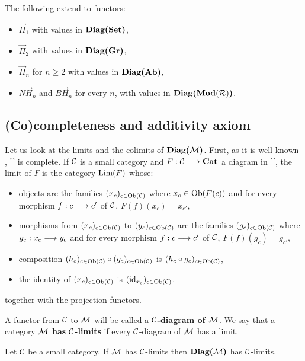 	\begin{coro}
	The following extend to functors:
	\begin{itemize}
		\item $\overrightarrow{\Pi}_1$ with values in $\textbf{Diag(}\textbf{Set}\textbf{)}$,
		\item $\overrightarrow{\Pi}_2$ with values in $\textbf{Diag(}\textbf{Gr}\textbf{)}$,
		\item $\overrightarrow{\Pi}_n$ for $n \geq 2$ with values in $\textbf{Diag(}\textbf{Ab}\textbf{)}$,
		\item $\overrightarrow{NH}_n$ and $\overrightarrow{BH}_n$ for every $n$, with values in $\textbf{Diag(}\textbf{Mod}(\mathcal{R})\textbf{)}$.
	\end{itemize}
	\end{coro}

	
	\subsection{(Co)completeness and additivity axiom}
	
	Let us look at the limits and the colimits of $\textbf{Diag(}\mathcal{M}\textbf{)}$. First, as it is well known \cite{maclane78}, $\cat$ is complete. If $\mathcal{C}$ is a small category and $F : \mathcal{C} \longrightarrow \textbf{Cat}$ a diagram in $\cat$, the limit of $F$ is the category $\text{Lim}(F)$ whose:
\begin{itemize}
	\item objects are the families $(x_c)_{c\in\text{Ob}(\mathcal{C})}$ where $x_c \in \text{Ob}(F(c))$ and for every morphism $f : c \longrightarrow c'$ of $\mathcal{C}$, $F(f)(x_c) = x_{c'}$,
	\item morphisms from $(x_c)_{c\in\text{Ob}(\mathcal{C})}$ to $(y_c)_{c\in\text{Ob}(\mathcal{C})}$ are the families $(g_c)_{c\in\text{Ob}(\mathcal{C})}$ where $g_c : x_c \longrightarrow y_c$ and for every morphism $f : c \longrightarrow c'$ of $\mathcal{C}$, $F(f)(g_c) = g_{c'}$,
	\item composition $(h_c)_{c\in\text{Ob}(\mathcal{C})}\circ(g_c)_{c\in\text{Ob}(\mathcal{C})}$ is $(h_c\circ g_c)_{c\in\text{Ob}(\mathcal{C})}$,
	\item the identity of $(x_c)_{c\in\text{Ob}(\mathcal{C})}$ is $(\text{id}_{x_c})_{c\in\text{Ob}(\mathcal{C})}$.
\end{itemize}
together with the projection functors.

A functor from $\mathcal{C}$ to $\mathcal{M}$ will be called a \textbf{$\mathcal{C}$-diagram of $\mathcal{M}$}. We say that a category \textbf{$\mathcal{M}$ has $\mathcal{C}$-limits} if every $\mathcal{C}$-diagram of $\mathcal{M}$ has a limit.

\begin{prop} Let $\mathcal{C}$ be a small category. If $\mathcal{M}$ has $\mathcal{C}$-limits then $\textbf{Diag(}\mathcal{M}\textbf{)}$ has $\mathcal{C}$-limits.
\end{prop}


